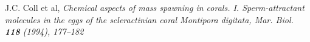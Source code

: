 \documentclass[12pt,reqno]{amsart}
\begin{document}
\begin{thebibliography}{[MT]}










 J.C. Coll et al, \it Chemical aspects of mass spawning in corals. I. Sperm-attractant molecules in the eggs of the scleractinian coral Montipora digitata,
\rm Mar. Biol. {\bf 118} (1994), 177--182


\end{thebibliography}
\end{document}

